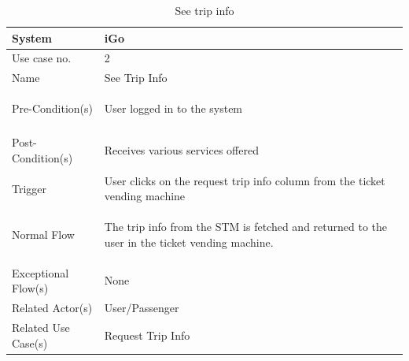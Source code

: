 \documentclass{article}
\begin{document}
\begin{table}[ht]
    \centering
    \begin{tabular}{|l|p{11cm}|}
         \hline
         System& iGo\\
         \hline
         Use case no. & 2 \\
         \hline
         Name & See Trip Info \\
         \hline
         Pre-Condition(s)   & 
         \begin{enumerate*}[itemjoin=\newline]
             \item User logged in to the system
         \end{enumerate*} \\
         \hline
         Post-Condition(s)  & 
         \begin{enumerate*}[itemjoin=\newline]
             \item Receives various services offered
         \end{enumerate*} \\
         \hline
         Trigger& User clicks on the request trip info column from the ticket vending machine \\
         \hline
         Normal Flow        & 
         \begin{enumerate*}[itemjoin=\newline]
             \item The trip info from the STM is fetched and returned to the user in the ticket vending machine.  
         \end{enumerate*} \\
         \hline
         Exceptional Flow(s)& None\\
         \hline
         Related Actor(s)   & User/Passenger\\
         \hline
         Related Use Case(s)& Request Trip Info\\
         \hline
    \end{tabular}
    \caption{See trip info}
    \label{tab:UC_tripInfo}
\end{table}
\pagebreak
\end{document}
